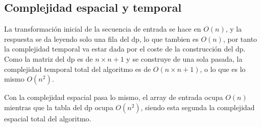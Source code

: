 \documentclass[11pt]{article}
\begin{document}
    \subsection{Complejidad espacial y temporal}
    La transformación inicial de la secuencia de entrada se hace en $O(n)$, y la respuesta se da leyendo solo
    una fila del dp, lo que tambien es $O(n)$, por tanto la complejidad temporal va estar dada por el coste
    de la construcción del dp. Como la matriz del dp es de $n \times n + 1$ y se construye de una sola pasada,
    la complejidad temporal total del algoritmo es de $O(n \times n+1)$, o lo que es lo mismo $O(n^2)$.

    Con la complejidad espacial pasa lo mismo, el array de entrada ocupa $O(n)$ mientras que la tabla del dp ocupa
    $O(n^2)$, siendo esta segunda la complejidad espacial total del algoritmo.
\end{document}

